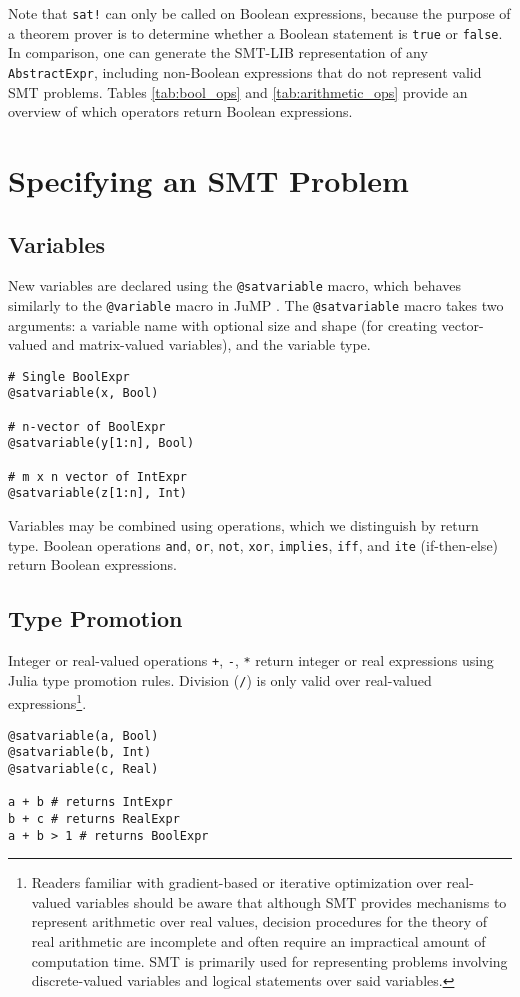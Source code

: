 \documentclass[conference]{IEEEtran}
\begin{document}
Note that \verb|sat!| can only be called on Boolean expressions, because the purpose of a theorem prover is to determine whether a Boolean statement is \verb|true| or \verb|false|. In comparison, one can generate the SMT-LIB representation of any \verb|AbstractExpr|, including non-Boolean expressions that do not represent valid SMT problems. Tables \ref{tab:bool_ops} and \ref{tab:arithmetic_ops} provide an overview of which operators return Boolean expressions.

\section{Specifying an SMT Problem}
\subsection{Variables}
New variables are declared using the \verb|@satvariable| macro, which behaves similarly to the \verb|@variable| macro in JuMP \cite{Lubin2023}.
The \verb|@satvariable| macro takes two arguments: a variable name with optional size and shape (for creating vector-valued and matrix-valued variables), and the variable type.

\begin{verbatim}
# Single BoolExpr
@satvariable(x, Bool)

# n-vector of BoolExpr
@satvariable(y[1:n], Bool)

# m x n vector of IntExpr
@satvariable(z[1:n], Int)
\end{verbatim}
  
Variables may be combined using operations, which we distinguish by return type.
Boolean operations \verb|and|, \verb|or|, \verb|not|, \verb|xor|, \verb|implies|, \verb|iff|, and \verb|ite| (if-then-else) return Boolean expressions.


\subsection{Type Promotion}
Integer or real-valued operations \verb|+|, \verb|-|, \verb|*| return integer or real expressions using Julia type promotion rules. Division (\verb|/|) is only valid over real-valued expressions\footnote{Readers familiar with gradient-based or iterative optimization over real-valued variables should be aware that although SMT provides mechanisms to represent arithmetic over real values, decision procedures for the theory of real arithmetic are incomplete and often require an impractical amount of computation time. SMT is primarily used for representing problems involving discrete-valued variables and logical statements over said variables.
}.
\begin{verbatim}
@satvariable(a, Bool)
@satvariable(b, Int)
@satvariable(c, Real)

a + b # returns IntExpr
b + c # returns RealExpr
a + b > 1 # returns BoolExpr
\end{verbatim}
\end{document}
